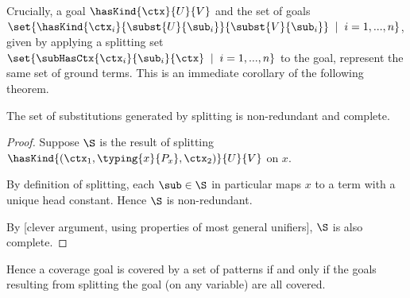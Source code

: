 Crucially, a goal $\hasKind{\ctx}{U}{V}$ and the set of goals $\set{\hasKind{\ctx_i}{\subst{U}{\sub_i}}{\subst{V}{\sub_i}} \;\;|\;\; i = 1, ..., n}$, given by applying a splitting set $\set{\subHasCtx{\ctx_i}{\sub_i}{\ctx} \;\;|\;\; i = 1, ..., n}$ to the goal, represent the same set of ground terms.
This is an immediate corollary of the following theorem.

\begin{theorem}
\label{thm:splitting-props}
The set of substitutions generated by splitting is non-redundant and complete.
\end{theorem}

\begin{proof}
Suppose $\S$ is the result of splitting $\hasKind{(\ctx_1, \typing{x}{P_x}, \ctx_2)}{U}{V}$ on $x$.

By definition of splitting, each $\sub \in \S$ in particular maps $x$ to a term with a unique head constant.
Hence $\S$ is non-redundant.

By [clever argument, using properties of most general unifiers], $\S$ is also complete.
\end{proof}

Hence a coverage goal is covered by a set of patterns if and only if the goals resulting from splitting the goal (on any variable) are all covered.

